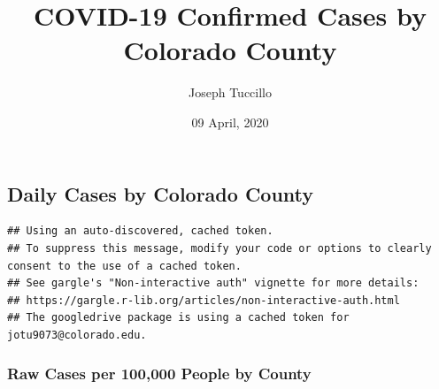 \documentclass[]{article}
\title{COVID-19 Confirmed Cases by Colorado County}
\author{Joseph Tuccillo}
\date{09 April, 2020}
\newenvironment{Shaded}{\begin{snugshade}}{\end{snugshade}}
\newcommand{\DataTypeTok}[1]{\textcolor[rgb]{0.13,0.29,0.53}{#1}}
\newcommand{\DecValTok}[1]{\textcolor[rgb]{0.00,0.00,0.81}{#1}}
\newcommand{\KeywordTok}[1]{\textcolor[rgb]{0.13,0.29,0.53}{\textbf{#1}}}
\newcommand{\NormalTok}[1]{#1}
\newcommand{\OperatorTok}[1]{\textcolor[rgb]{0.81,0.36,0.00}{\textbf{#1}}}
\newcommand{\OtherTok}[1]{\textcolor[rgb]{0.56,0.35,0.01}{#1}}
\newcommand{\StringTok}[1]{\textcolor[rgb]{0.31,0.60,0.02}{#1}}
\begin{document}
\maketitle

\begin{Shaded}
\end{Shaded}

\hypertarget{daily-cases-by-colorado-county}{%
\subsection{Daily Cases by Colorado
County}\label{daily-cases-by-colorado-county}}

\begin{verbatim}
## Using an auto-discovered, cached token.
## To suppress this message, modify your code or options to clearly consent to the use of a cached token.
## See gargle's "Non-interactive auth" vignette for more details:
## https://gargle.r-lib.org/articles/non-interactive-auth.html
## The googledrive package is using a cached token for jotu9073@colorado.edu.
\end{verbatim}

\hypertarget{raw-cases-per-100000-people-by-county}{%
\subsubsection{Raw Cases per 100,000 People by
County}\label{raw-cases-per-100000-people-by-county}}
\end{document}

